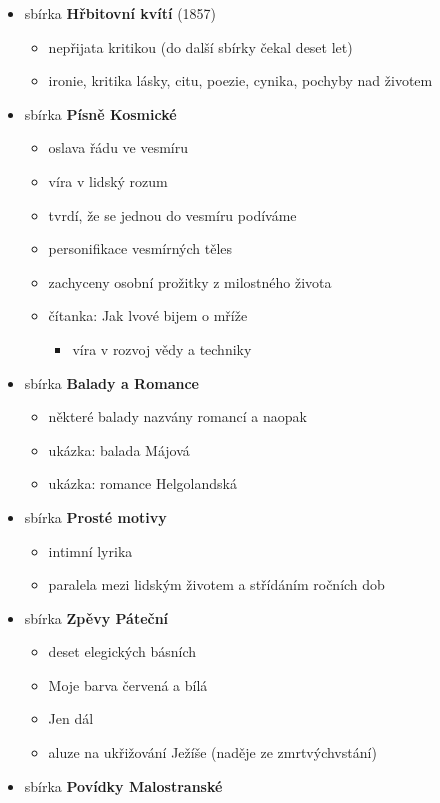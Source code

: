 \begin{itemize}
\item sbírka \textbf{Hřbitovní kvítí} (1857)
	\begin{itemize}
	\item nepřijata kritikou (\ra do další sbírky čekal deset let)
	\item ironie, kritika lásky, citu, poezie, cynika, pochyby nad životem
	\end{itemize}
\item sbírka \textbf{Písně Kosmické}
	\begin{itemize}
	\item oslava řádu ve vesmíru
	\item víra v lidský rozum
	\item tvrdí, že se jednou do vesmíru podíváme
	\item personifikace vesmírných těles
	\item zachyceny osobní prožitky z milostného života
	\item čítanka: Jak lvové bijem o mříže
		\begin{itemize}
		\item víra v rozvoj vědy a techniky
		\end{itemize}
	\end{itemize}
\item sbírka \textbf{Balady a Romance}
	\begin{itemize}
	\item některé balady nazvány romancí a naopak
	\item ukázka: balada Májová
	\item ukázka: romance Helgolandská
	\end{itemize}
\item sbírka \textbf{Prosté motivy}
	\begin{itemize}
	\item intimní lyrika
	\item paralela mezi lidským životem a střídáním ročních dob
	\end{itemize}
\item sbírka \textbf{Zpěvy Páteční}
	\begin{itemize}
	\item deset elegických básních
	\item Moje barva červená a bílá
	\item Jen dál
	\item aluze na ukřižování Ježíše (naděje ze zmrtvýchvstání)
	\end{itemize}
\item sbírka \textbf{Povídky Malostranské}

\end{itemize}

